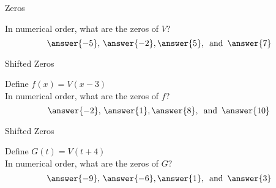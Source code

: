 \documentclass{ximera}
\begin{document}
\begin{exercise}
\begin{question} Zeros


In numerical order, what are the zeros of $V$? \\

\[
\answer{-5}, \, \answer{-2}, \answer{5}, \, \text{ and } \, \answer{7}
\]


\end{question}












\begin{question} Shifted Zeros 

Define $f(x) = V(x - 3)$ \\



In numerical order, what are the zeros of $f$? \\

\[
\answer{-2}, \, \answer{1}, \answer{8}, \, \text{ and } \, \answer{10}
\]


\end{question}















\begin{question} Shifted Zeros 

Define $G(t) = V(t + 4)$ \\


In numerical order, what are the zeros of $G$? \\

\[
\answer{-9}, \, \answer{-6}, \answer{1}, \, \text{ and } \, \answer{3}
\]

\end{question}







\end{exercise}
\end{document}
